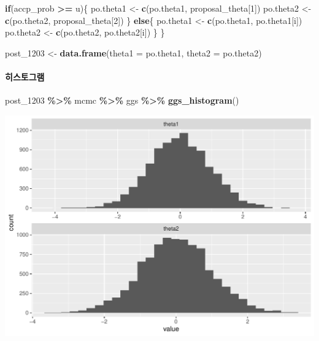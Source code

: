 \documentclass[
]{article}
\newenvironment{Shaded}{\begin{snugshade}}{\end{snugshade}}
\newcommand{\AttributeTok}[1]{\textcolor[rgb]{0.13,0.29,0.53}{#1}}
\newcommand{\ControlFlowTok}[1]{\textcolor[rgb]{0.13,0.29,0.53}{\textbf{#1}}}
\newcommand{\DecValTok}[1]{\textcolor[rgb]{0.00,0.00,0.81}{#1}}
\newcommand{\FunctionTok}[1]{\textcolor[rgb]{0.13,0.29,0.53}{\textbf{#1}}}
\newcommand{\NormalTok}[1]{#1}
\newcommand{\OtherTok}[1]{\textcolor[rgb]{0.56,0.35,0.01}{#1}}
\newcommand{\SpecialCharTok}[1]{\textcolor[rgb]{0.81,0.36,0.00}{\textbf{#1}}}
\begin{document}
\begin{Shaded}
\begin{Highlighting}[]
  \ControlFlowTok{if}\NormalTok{(accp\_prob }\SpecialCharTok{\textgreater{}=}\NormalTok{ u)\{}
\NormalTok{    po.theta1 }\OtherTok{\textless{}{-}} \FunctionTok{c}\NormalTok{(po.theta1, proposal\_theta[}\DecValTok{1}\NormalTok{])}
\NormalTok{    po.theta2 }\OtherTok{\textless{}{-}} \FunctionTok{c}\NormalTok{(po.theta2, proposal\_theta[}\DecValTok{2}\NormalTok{])}
\NormalTok{  \} }\ControlFlowTok{else}\NormalTok{\{}
\NormalTok{    po.theta1 }\OtherTok{\textless{}{-}} \FunctionTok{c}\NormalTok{(po.theta1, po.theta1[i])}
\NormalTok{    po.theta2 }\OtherTok{\textless{}{-}} \FunctionTok{c}\NormalTok{(po.theta2, po.theta2[i])}
\NormalTok{  \}}
\NormalTok{\}}

\NormalTok{post\_1203 }\OtherTok{\textless{}{-}} \FunctionTok{data.frame}\NormalTok{(}\AttributeTok{theta1 =}\NormalTok{ po.theta1, }\AttributeTok{theta2 =}\NormalTok{ po.theta2)}
\end{Highlighting}
\end{Shaded}

\paragraph{히스토그램}\label{uxd788uxc2a4uxd1a0uxadf8uxb7a8}

\begin{Shaded}
\begin{Highlighting}[]
\NormalTok{post\_1203 }\SpecialCharTok{\%\textgreater{}\%}\NormalTok{ mcmc }\SpecialCharTok{\%\textgreater{}\%}\NormalTok{ ggs }\SpecialCharTok{\%\textgreater{}\%} \FunctionTok{ggs\_histogram}\NormalTok{()}
\end{Highlighting}
\end{Shaded}

\begin{center}\includegraphics[width=0.8\linewidth]{Bayes_stat_hw3_files/figure-latex/unnamed-chunk-5-1} \end{center}
\end{document}
